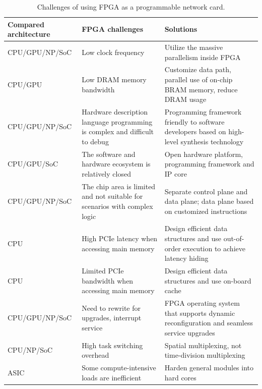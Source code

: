\begin{table}[htbp]
	\centering
	\caption{Challenges of using FPGA as a programmable network card.}
	\small
	\begin{tabular}{l|p{}|p{}}
		\hline
		Compared architecture & FPGA challenges & Solutions \\
		\hline
		\hline
		CPU/GPU/NP/SoC & Low clock frequency & Utilize the massive parallelism inside FPGA \\
		\hline 
		CPU/GPU & Low DRAM memory bandwidth & Customize data path, parallel use of on-chip BRAM memory, reduce DRAM usage \\
		\hline
		CPU/GPU/NP/SoC & Hardware description language programming is complex and difficult to debug & Programming framework friendly to software developers based on high-level synthesis technology \\
		\hline
		CPU/GPU/SoC & The software and hardware ecosystem is relatively closed & Open hardware platform, programming framework and IP core \\
		\hline
		CPU/GPU/NP/SoC & The chip area is limited and not suitable for scenarios with complex logic & Separate control plane and data plane; data plane based on customized instructions \\
		\hline
		CPU & High PCIe latency when accessing main memory & Design efficient data structures and use out-of-order execution to achieve latency hiding \\
		\hline
		CPU & Limited PCIe bandwidth when accessing main memory & Design efficient data structures and use on-board cache \\
		\hline
		CPU/GPU/NP/SoC & Need to rewrite for upgrades, interrupt service & FPGA operating system that supports dynamic reconfiguration and seamless service upgrades \\
		\hline
		CPU/NP/SoC & High task switching overhead & Spatial multiplexing, not time-division multiplexing \\
		\hline
		ASIC & Some compute-intensive loads are inefficient & Harden general modules into hard cores \\
		\hline
	\end{tabular}
	\label{background:tab:fpga-challenges}
\end{table}


